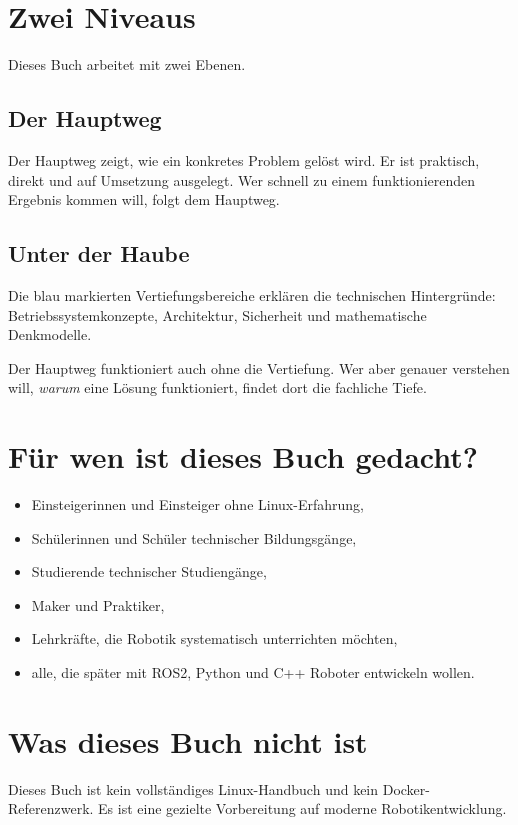 
\section*{Zwei Niveaus}

Dieses Buch arbeitet mit zwei Ebenen.

\subsection*{Der Hauptweg}
Der Hauptweg zeigt, wie ein konkretes Problem gelöst wird. Er ist praktisch,
direkt und auf Umsetzung ausgelegt. Wer schnell zu einem funktionierenden
Ergebnis kommen will, folgt dem Hauptweg.

\subsection*{Unter der Haube}
Die blau markierten Vertiefungsbereiche erklären die technischen Hintergründe:
Betriebssystemkonzepte, Architektur, Sicherheit und mathematische Denkmodelle.

Der Hauptweg funktioniert auch ohne die Vertiefung. Wer aber genauer verstehen
will, \emph{warum} eine Lösung funktioniert, findet dort die fachliche Tiefe.

\section*{Für wen ist dieses Buch gedacht?}

\begin{itemize}
  \item Einsteigerinnen und Einsteiger ohne Linux-Erfahrung,
  \item Schülerinnen und Schüler technischer Bildungsgänge,
  \item Studierende technischer Studiengänge,
  \item Maker und Praktiker,
  \item Lehrkräfte, die Robotik systematisch unterrichten möchten,
  \item alle, die später mit ROS2, Python und C++ Roboter entwickeln wollen.
\end{itemize}

\section*{Was dieses Buch nicht ist}

Dieses Buch ist kein vollständiges Linux-Handbuch und kein Docker-Referenzwerk.
Es ist eine gezielte Vorbereitung auf moderne Robotikentwicklung.
